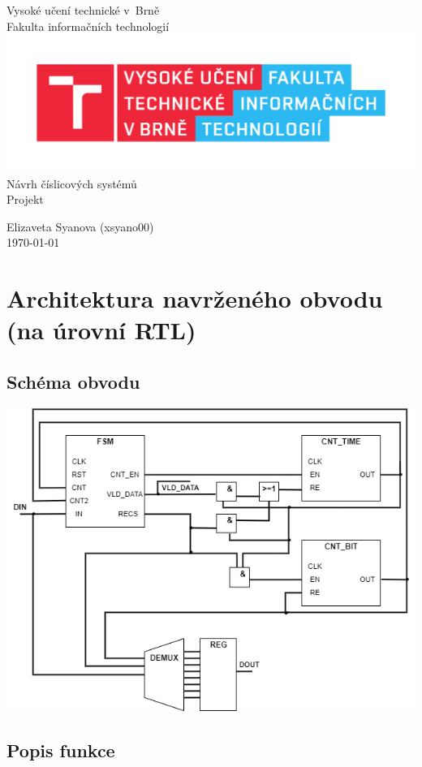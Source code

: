 \documentclass[a4paper, 11pt]{article}
\begin{document}
	
			\begin{center}
				{\Large
					Vysoké učení technické v~Brně \\
					Fakulta informačních technologií \\
				}
				{\includegraphics[width=0.4\linewidth]{pic/FIT_logo.pdf}} \\

				{\LARGE
					Návrh číslicových systémů \\
					Projekt \\[0.4cm]
				}

				{\large
					Elizaveta Syanova (xsyano00) \\
					\today
				}
			\end{center}
	

    \section{Architektura navrženého obvodu (na úrovní RTL)}
	\subsection{Schéma obvodu}
	
	\begin{center}
	     \includegraphics[width=0.85\linewidth]{pic/2ONE.png} 
	\end{center}
	
	
	
	\subsection{Popis funkce}
	
\end{document}
